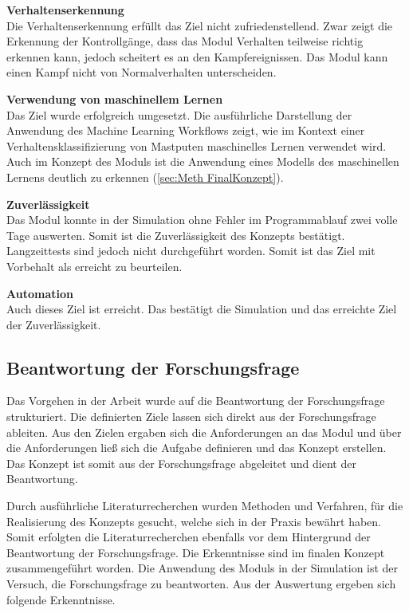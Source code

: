 \textbf{Verhaltenserkennung}\\
Die Verhaltenserkennung erfüllt das Ziel nicht zufriedenstellend. Zwar zeigt die Erkennung der Kontrollgänge, dass das Modul Verhalten teilweise richtig erkennen kann, jedoch scheitert es an den Kampfereignissen. Das Modul kann einen Kampf nicht von Normalverhalten unterscheiden. \par

\textbf{Verwendung von maschinellem Lernen}\\
Das Ziel wurde erfolgreich umgesetzt. Die ausführliche Darstellung der Anwendung des Machine Learning Workflows zeigt, wie im Kontext einer Verhaltensklassifizierung von Mastputen maschinelles Lernen verwendet wird. Auch im Konzept des Moduls ist die Anwendung eines Modells des maschinellen Lernens deutlich zu erkennen (\autoref{sec:Meth FinalKonzept}). \par

\textbf{Zuverlässigkeit}\\
Das Modul konnte in der Simulation ohne Fehler im Programmablauf zwei volle Tage auswerten. Somit ist die Zuverlässigkeit des Konzepts bestätigt. Langzeittests sind jedoch nicht durchgeführt worden. Somit ist das Ziel mit Vorbehalt als erreicht zu beurteilen. 
\par

\textbf{Automation}\\
Auch dieses Ziel ist erreicht. Das bestätigt die Simulation und das erreichte Ziel der Zuverlässigkeit.\par



\subsection{Beantwortung der Forschungsfrage}
Das Vorgehen in der Arbeit wurde auf die Beantwortung der Forschungsfrage strukturiert. Die definierten Ziele lassen sich direkt aus der Forschungsfrage ableiten. Aus den Zielen ergaben sich die Anforderungen an das Modul und über die Anforderungen ließ sich die Aufgabe definieren und das Konzept erstellen. Das Konzept ist somit aus der Forschungsfrage abgeleitet und dient der Beantwortung. \par

Durch ausführliche Literaturrecherchen wurden Methoden und Verfahren, für die Realisierung des Konzepts gesucht, welche sich in der Praxis bewährt haben. Somit erfolgten die Literaturrecherchen ebenfalls vor dem Hintergrund der Beantwortung der Forschungsfrage. Die Erkenntnisse sind im finalen Konzept zusammengeführt worden. Die Anwendung des Moduls in der Simulation ist der Versuch, die Forschungsfrage zu beantworten. Aus der Auswertung ergeben sich folgende Erkenntnisse.\par

